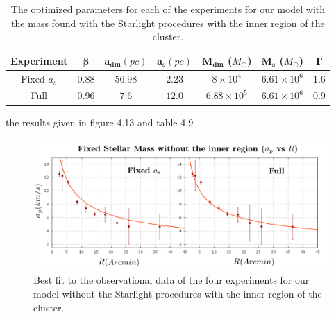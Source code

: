 \begin{table}[H]
\begin{center}
\begin{tabular}{| c| c| c| c| c| c| c|}
    \hline
    \textbf{Experiment} & $\mathbf{\beta}$ & $\mathbf{a_{dm}} (pc)$ & $\mathbf{a_{s}} (pc)$ & $\mathbf{M_{dm}}$ ($M_{\odot}$) & $\mathbf{M_{s}}$ ($M_{\odot}$) & $\mathbf{\Gamma}$\\ \hline
	Fixed $a_s$ &	$0.88$ &	$56.98$ &	$2.23$ &	$8 \times 10^{4}$ &	$6.61 \times 10 ^{6}$ &	$1.6$\\ \hline
	Full &	$0.96$ &	$7.6$ &	$12.0$ &	$6.88 \times 10^{5}$ &	$6.61 \times 10^{6}$ &	$0.9$\\ \hline
  \end{tabular} 
\caption[Optimized parameters for our model with the mass found with the Starlight procedures with the inner region.]{The optimized parameters for each of the experiments for our model with the mass found with the Starlight procedures with the inner region of the cluster.}
\end{center}
\end{table}

the results given in figure 4.13 and table 4.9

\begin{figure}[H]
\centering
\includegraphics[width=15cm]{images/Starlight_1.png}
\caption[Best fit of our model with the mass found with the Starlight procedures without the inner region]{Best fit to the observational data of the four experiments for our model without the Starlight procedures with the inner region of the cluster.}
\end{figure}

